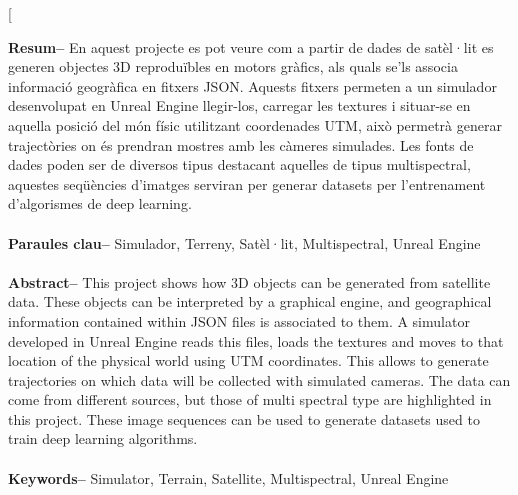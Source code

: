 \documentclass[10pt,a4paper,twocolumn,twoside]{article}
\begin{document}
\twocolumn[\begin{@twocolumnfalse}

{
\vspace*{-1cm}
\maketitle
}

\thispagestyle{primerapagina}
\begin{center}
\parbox{0.915\textwidth}
{\sffamily\small
\textbf{Resum--} En aquest projecte es pot veure com a partir de dades de satèl·lit es generen objectes 3D reproduïbles en motors gràfics, als quals se'ls associa informació geogràfica en fitxers JSON. Aquests fitxers permeten a un simulador desenvolupat en Unreal Engine llegir-los, carregar les textures i situar-se en aquella posició del món físic utilitzant coordenades UTM, això permetrà generar trajectòries on és prendran mostres amb les càmeres simulades. Les fonts de dades poden ser de diversos tipus destacant aquelles de tipus multispectral, aquestes seqüències d'imatges serviran per generar datasets per l'entrenament d'algorismes de deep learning.
\\
\\
\textbf{Paraules clau-- }
Simulador, Terreny, Satèl·lit, Multispectral, Unreal Engine\\
\\
\textbf{Abstract--}  This project shows how 3D objects can be generated from satellite data. These objects can be interpreted by a graphical engine, and geographical information contained within JSON files is associated to them. A simulator developed in Unreal Engine reads this files, loads the textures and moves to that location of the physical world using UTM coordinates. This allows to generate trajectories on which data will be collected with simulated cameras. The data can come from different sources, but those of multi spectral type are highlighted in this project. These image sequences can be used to generate datasets used to train deep learning algorithms.
\\
\\
\textbf{Keywords-- }
Simulator, Terrain, Satellite, Multispectral, Unreal Engine\\
\\
}


\end{center}
\end{@twocolumnfalse}
\end{document}
